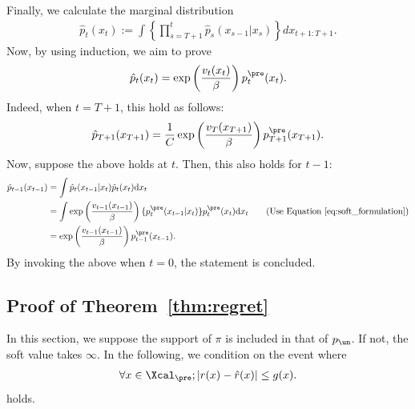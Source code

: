 Finally, we calculate the marginal distribution 
\begin{align*}
    \hat p_t(x_t):=\int \left\{ \prod_{s=T+1}^t \hat p_{s}(x_{s-1}|x_s) \right\} dx_{t+1:T+1}. 
\end{align*}
Now, by using induction, we aim to prove 
\begin{align*}
    \hat p_{t}(x_{t})=  \exp\left(\frac{v_{t}(x_{t}) }{\beta} \right)p^{\pre}_{t}(x_{t}). 
\end{align*}
Indeed, when $t=T+1$, this hold as follows: 
\begin{align*}
    \hat p_{T+1}(x_{T+1}) = \frac{1}{C}  \exp\left(\frac{v_{T}(x_{T+1}) }{ \beta} \right)p^{\pre}_{T+1}(x_{T+1}). 
\end{align*}
Now, suppose the above holds at $t$. Then, this also holds for $t-1$: 
\begin{align*}
      \hat p_{t-1}(x_{t-1})& =\int  \hat p_t(x_{t-1}|x_t)   \hat p_{t}(x_{t})\mathrm{d}x_t  \\
      &=\int \exp\left(\frac{v_{t-1}(x_{t-1}) }{\beta} \right) \{ p^{\pre}_t(x_{t-1}|x_t) \} p^{\pre}_{t}(x_{t}) \mathrm{d}x_t  \tag{Use Equation~\ref{eq:soft_formulation}}  \\
      &= \exp\left(\frac{v_{t-1}(x_{t-1}) }{\beta} \right)p^{\pre}_{t-1}(x_{t-1}). 
\end{align*}
By invoking the above when $t=0$, the statement is concluded. 


\subsection{Proof of Theorem~\ref{thm:regret} }

In this section, we suppose the support of $\pi$ is included in that of $p_{\un}$. If not, the soft value takes $\infty$. In the following, we condition on the event where 
\begin{align*}
  \forall x\in \Xcal_{\pre};  |r(x) - \hat r(x)| \le g(x). 
\end{align*}
holds. 

